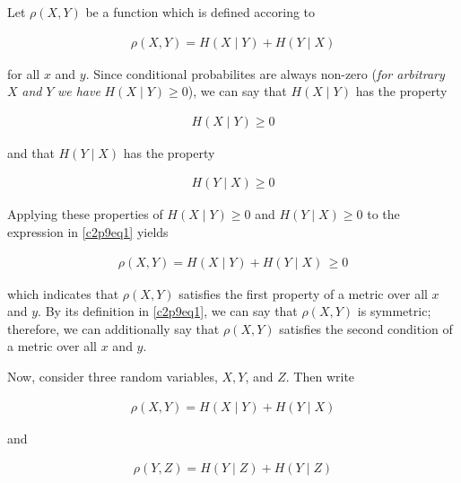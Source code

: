 \documentclass[ClusteringConnectionsMAIN.tex]{subfiles}
\begin{document}
	

  Let $\rho \left( X, Y \right)$ be a function which is defined accoring to

\begin{align} \label{c2p9eq1}
\rho \left( X, Y \right) = H \left( X \mid Y \right)+ H \left( Y \mid X \right)  \tag{2.9-1}
\end{align}

for all $x$ and $y$.  Since conditional probabilites are always non-zero (\emph{for arbitrary} $X$ \emph{and} $Y$ \emph{we have} $H \left( X \mid Y \right) \geq 0$), we can say that $H \left( X \mid Y \right)$ has the property

\begin{align*}
H \left( X \mid Y \right) \geq 0
\end{align*} 

and that $H \left( Y \mid X \right)$ has the property

\begin{align*}
H \left( Y \mid X \right) \geq 0
\end{align*} 

Applying these properties of $H \left( X \mid Y \right) \geq 0$ and $H \left( Y \mid X \right) \geq 0$ to the expression in \ref{c2p9eq1} yields

\begin{align} \label{c2p9eq2}
\rho \left( X, Y \right) = H \left( X \mid Y \right)+ H \left( Y \mid X \right)  \, \geq 0  \tag{2.9-2}
\end{align}

which indicates that $\rho \left( X, Y \right)$ satisfies the first property of a metric over all $x$ and $y$.  By its definition in \ref{c2p9eq1}, we can say that $\rho \left( X, Y \right)$ is symmetric; therefore, we can additionally say that $\rho \left( X, Y \right)$ satisfies the second condition of a metric over all $x$ and $y$. \newline


Now, consider three random variables, $X, Y$, and $Z$.  Then write

\begin{align} \label{c2p9eq3}
\rho \left( X, Y \right) = H \left( X \mid Y \right)+ H \left( Y \mid X \right)  \tag{2.9-3}
\end{align}

and

\begin{align} \label{c2p9eq4}
\rho \left( Y, Z \right) = H \left( Y \mid Z \right)+ H \left( Y \mid Z \right)  \tag{2.9-4}
\end{align}
\end{document}
